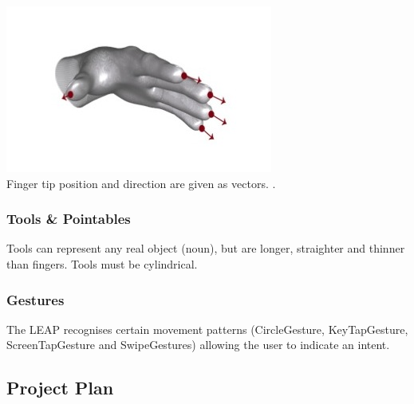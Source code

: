 \documentclass[a4paper, 11pt]{article}
\begin{document}
\begin{center}
\includegraphics[scale=0.7]{fingers}\\
Finger tip position and direction are given as vectors. \cite{leap}.
\end{center}


\subsubsection{Tools \& Pointables}
Tools can represent any real object (noun), but are longer, straighter and thinner than fingers. Tools must be cylindrical.

\subsubsection{Gestures}
The LEAP recognises certain movement patterns (CircleGesture, KeyTapGesture, ScreenTapGesture and SwipeGestures) allowing the user to indicate an intent.


\subsection{Project Plan}\label{plan}
\end{document}
